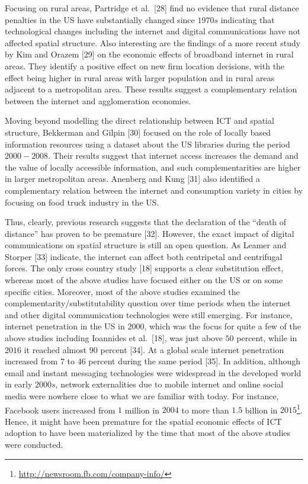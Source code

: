\documentclass[10pt,letterpaper]{article}
\begin{document}
\color{blue}

Focusing on rural areas, Partridge et al.~{[}28{]} find no evidence that
rural distance penalties in the US have substantially changed since
\(1970s\) indicating that technological changes including the internet
and digital communications have not affected spatial structure. Also
interesting are the findings of a more recent study by Kim and Orazem
{[}29{]} on the economic effects of broadband internet in rural areas.
They identify a positive effect on new firm location decisions, with the
effect being higher in rural areas with larger population and in rural
areas adjacent to a metropolitan area. These results suggest a
complementary relation between the internet and agglomeration economies.

\color{blue}

Moving beyond modelling the direct relationship between ICT and spatial
structure, Bekkerman and Gilpin {[}30{]} focused on the role of locally
based information resources using a dataset about the US libraries
during the period \(2000-2008\). Their results suggest that internet
access increases the demand and the value of locally accessible
information, and such complementarities are higher in larger
metropolitan areas. Anenberg and Kung {[}31{]} also identified a
complementary relation between the internet and consumption variety in
cities by focusing on food truck industry in the US.

\color{black}

Thus, clearly, previous research suggests that the declaration of the
``death of distance'' has proven to be premature {[}32{]}. However, the
exact impact of digital communications on spatial structure is still an
open question. As Leamer and Storper {[}33{]} indicate, the internet can
affect both centripetal and centrifugal forces. The only cross country
study {[}18{]} supports a clear substitution effect, whereas most of the
above studies have focused either on the US or on some specific cities.
Moreover, most of the above studies examined the
complementarity/substitutability question over time periods when the
internet and other digital communication technologies were still
emerging. For instance, internet penetration in the US in \(2000\),
which was the focus for quite a few of the above studies including
Ioannides et al.~{[}18{]}, was just above \(50\) percent, while in
\(2016\) it reached almost \(90\) percent {[}34{]}. At a global scale
internet penetration increased from \(7\) to \(46\) percent during the
same period {[}35{]}. In addition, although email and instant messaging
technologies were widespread in the developed world in early \(2000s\),
network externalities due to mobile internet and online social media
were nowhere close to what we are familiar with today. For instance,
Facebook users increased from \(1\) million in \(2004\) to more than
\(1.5\) billion in \(2015\)\footnote{\url{http://newsroom.fb.com/company-info/}}.
Hence, it might have been premature for the spatial economic effects of
ICT adoption to have been materialized by the time that most of the
above studies were conducted.
\end{document}
